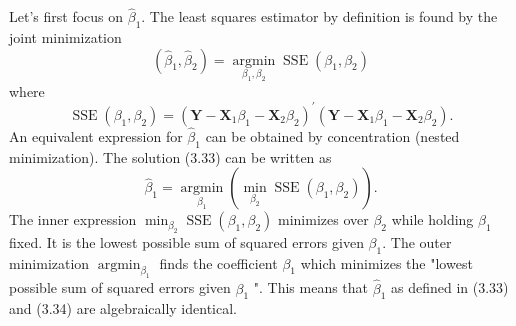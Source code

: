 \documentclass[10pt]{article}
\begin{document}
Let's first focus on $\widehat{\beta}_{1}$. The least squares estimator by definition is found by the joint minimization
$$
\left(\widehat{\beta}_{1}, \widehat{\beta}_{2}\right)=\underset{\beta_{1}, \beta_{2}}{\operatorname{argmin}} \operatorname{SSE}\left(\beta_{1}, \beta_{2}\right)
$$
where
$$
\operatorname{SSE}\left(\beta_{1}, \beta_{2}\right)=\left(\boldsymbol{Y}-\boldsymbol{X}_{1} \beta_{1}-\boldsymbol{X}_{2} \beta_{2}\right)^{\prime}\left(\boldsymbol{Y}-\boldsymbol{X}_{1} \beta_{1}-\boldsymbol{X}_{2} \beta_{2}\right) .
$$
An equivalent expression for $\widehat{\beta}_{1}$ can be obtained by concentration (nested minimization). The solution (3.33) can be written as
$$
\widehat{\beta}_{1}=\underset{\beta_{1}}{\operatorname{argmin}}\left(\min _{\beta_{2}} \operatorname{SSE}\left(\beta_{1}, \beta_{2}\right)\right) .
$$
The inner expression $\min _{\beta_{2}} \operatorname{SSE}\left(\beta_{1}, \beta_{2}\right)$ minimizes over $\beta_{2}$ while holding $\beta_{1}$ fixed. It is the lowest possible sum of squared errors given $\beta_{1}$. The outer minimization $\operatorname{argmin}_{\beta_{1}}$ finds the coefficient $\beta_{1}$ which minimizes the "lowest possible sum of squared errors given $\beta_{1}$ ". This means that $\widehat{\beta}_{1}$ as defined in (3.33) and (3.34) are algebraically identical.
\end{document}
